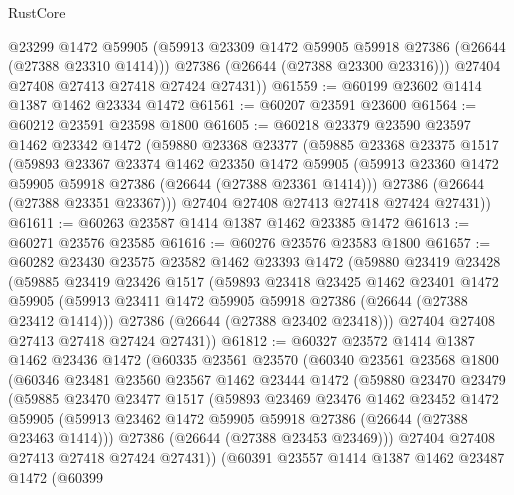 \begin{lexlean}{RustCore}
\begin{coremodule}
          @23299
          @1472
          @59905
          (@59913 @23309 @1472 @59905 @59918 @27386 (@26644 (@27388 @23310 @1414)))
          @27386
          (@26644 (@27388 @23300 @23316)))
        @27404
        @27408
        @27413
        @27418
        @27424
        @27431))
@61559 := @60199 @23602 @1414 @1387 @1462 @23334 @1472
@61561 := @60207 @23591 @23600
@61564 := @60212 @23591 @23598 @1800
@61605 := @60218
    @23379
    @23590
    @23597
    @1462
    @23342
    @1472
    (@59880
      @23368
      @23377
      (@59885
        @23368
        @23375
        @1517
        (@59893
          @23367
          @23374
          @1462
          @23350
          @1472
          @59905
          (@59913 @23360 @1472 @59905 @59918 @27386 (@26644 (@27388 @23361 @1414)))
          @27386
          (@26644 (@27388 @23351 @23367)))
        @27404
        @27408
        @27413
        @27418
        @27424
        @27431))
@61611 := @60263 @23587 @1414 @1387 @1462 @23385 @1472
@61613 := @60271 @23576 @23585
@61616 := @60276 @23576 @23583 @1800
@61657 := @60282
    @23430
    @23575
    @23582
    @1462
    @23393
    @1472
    (@59880
      @23419
      @23428
      (@59885
        @23419
        @23426
        @1517
        (@59893
          @23418
          @23425
          @1462
          @23401
          @1472
          @59905
          (@59913 @23411 @1472 @59905 @59918 @27386 (@26644 (@27388 @23412 @1414)))
          @27386
          (@26644 (@27388 @23402 @23418)))
        @27404
        @27408
        @27413
        @27418
        @27424
        @27431))
@61812 := @60327
    @23572
    @1414
    @1387
    @1462
    @23436
    @1472
    (@60335
      @23561
      @23570
      (@60340
        @23561
        @23568
        @1800
        (@60346
          @23481
          @23560
          @23567
          @1462
          @23444
          @1472
          (@59880
            @23470
            @23479
            (@59885
              @23470
              @23477
              @1517
              (@59893
                @23469
                @23476
                @1462
                @23452
                @1472
                @59905
                (@59913 @23462 @1472 @59905 @59918 @27386 (@26644 (@27388 @23463 @1414)))
                @27386
                (@26644 (@27388 @23453 @23469)))
              @27404
              @27408
              @27413
              @27418
              @27424
              @27431))
          (@60391
            @23557
            @1414
            @1387
            @1462
            @23487
            @1472
            (@60399

\end{coremodule}
\end{lexlean}
